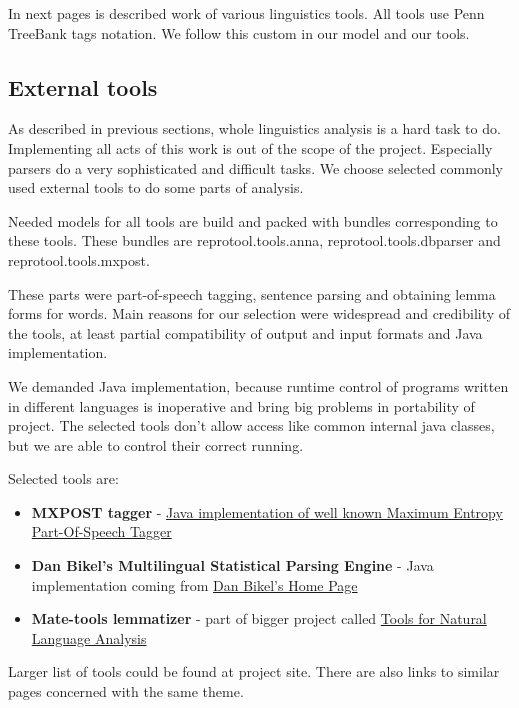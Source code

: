 In next pages is described work of various linguistics tools. All tools use Penn TreeBank tags notation. We follow this custom in our model and our tools.

\subsection{External tools}
\label{sec:externaltools}
As described in previous sections, whole linguistics analysis is a hard task to do. Implementing all acts of this work is out of the scope of the project.  Especially parsers do a very sophisticated and difficult tasks. We choose selected commonly used external tools to do some parts of analysis. 

Needed models for all tools are build and packed with bundles corresponding to these tools. These bundles are reprotool.tools.anna,  reprotool.tools.dbparser and reprotool.tools.mxpost.

These parts were part-of-speech tagging, sentence parsing and obtaining lemma forms for words. Main reasons for our selection were widespread  and credibility of the tools, at least partial compatibility of output and input formats and Java implementation. 

We demanded Java implementation, because runtime control of programs written in different languages is inoperative and bring big problems in portability of project. The selected tools don't allow access like common internal java classes, but we are able to control their correct running.

Selected tools are:
 
\begin{itemize}
\item {\bf MXPOST tagger} - \href{http://www.inf.ed.ac.uk/resources/nlp/local_doc/MXPOST.html}{Java implementation of well known Maximum Entropy Part-Of-Speech Tagger}
\item {\bf Dan Bikel's Multilingual Statistical Parsing Engine } - Java implementation coming from \href{http://www.cis.upenn.edu/~dbikel/software.html#stat-parser}{Dan Bikel’s Home Page}
\item {\bf Mate-tools lemmatizer} - part of bigger project called \href{http://code.google.com/p/mate-tools/}{Tools for Natural Language Analysis}
\end{itemize}

Larger list of tools could be found at project site. There are also links to similar pages concerned with the same theme. 
          
